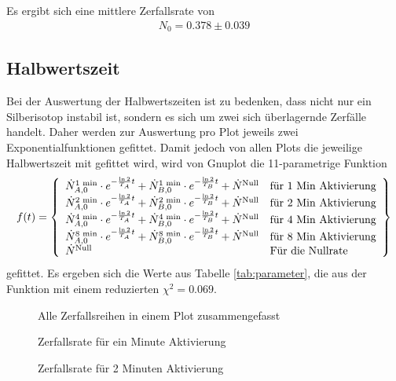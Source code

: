 \documentclass[12pt,a4paper,titlepage,headinclude,bibtotoc]{scrartcl}
\begin{document}
Es ergibt sich eine mittlere Zerfallsrate von 
\begin{align}
N_0=0.378\pm 0.039\label{eq:nullrate}
\end{align}


\subsection{Halbwertszeit}
Bei der Auswertung der Halbwertszeiten ist zu bedenken, dass nicht nur ein Silberisotop instabil ist, sondern es sich um zwei sich überlagernde Zerfälle handelt.
Daher werden zur Auswertung pro Plot jeweils zwei Exponentialfunktionen gefittet.
Damit jedoch von allen Plots die jeweilige Halbwertszeit mit gefittet wird, wird von Gnuplot die 11-parametrige Funktion 
\begin{align}
	f(t)=\left\{
		\begin{array}[]{l  l}
\dot{N}_{A,0}^{1\text{ min}}\cdot e^{-\frac{\ln 2}{T_A}t}+\dot{N}_{B,0}^{1\text{ min}}\cdot e^{-\frac{\ln 2}{T_B}t}+\dot{N}^{\text{Null}}&\text{für 1 Min Aktivierung}\\
\dot{N}_{A,0}^{2\text{ min}}\cdot e^{-\frac{\ln 2}{T_A}t}+\dot{N}_{B,0}^{2\text{ min}}\cdot e^{-\frac{\ln 2}{T_B}t}+\dot{N}^{\text{Null}}&\text{für 2 Min Aktivierung}\\
\dot{N}_{A,0}^{4\text{ min}}\cdot e^{-\frac{\ln 2}{T_A}t}+\dot{N}_{B,0}^{4\text{ min}}\cdot e^{-\frac{\ln 2}{T_B}t}+\dot{N}^{\text{Null}}&\text{für 4 Min Aktivierung}\\
\dot{N}_{A,0}^{8\text{ min}}\cdot e^{-\frac{\ln 2}{T_A}t}+\dot{N}_{B,0}^{8\text{ min}}\cdot e^{-\frac{\ln 2}{T_B}t}+\dot{N}^{\text{Null}}&\text{für 8 Min Aktivierung}\\
\dot{N}^\text{Null}&\text{Für die Nullrate}
\end{array}
	 \right\}
	\label{eq:funktion}
\end{align}
gefittet.
Es ergeben sich die Werte aus Tabelle \ref{tab:parameter}, die aus der Funktion mit einem reduzierten $\chi^2 = 0.069$.


\begin{figure}[h]
\centering

\caption{Alle Zerfallsreihen in einem Plot zusammengefasst}
\label{fig:alle}
\end{figure}
\begin{figure}[h]
\centering

\caption{Zerfallsrate für ein Minute Aktivierung}
\label{fig:1min}
\end{figure}

\begin{figure}[h]
\centering

\caption{Zerfallsrate für 2 Minuten Aktivierung}
\label{fig:2min}
\end{figure}
\end{document}
